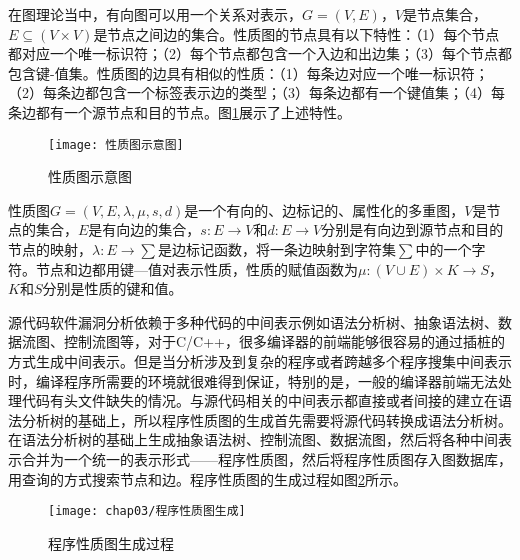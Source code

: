 在图理论当中，有向图可以用一个关系对表示，$G=(V,E)$，$V$是节点集合，$E\subseteq(V \times V)$是节点之间边的集合。性质图的节点具有以下特性：{（1）}每个节点都对应一个唯一标识符；{（2）}每个节点都包含一个入边和出边集；{（3）}每个节点都包含键-值集。性质图的边具有相似的性质：{（1）}每条边对应一个唯一标识符；{（2）}每条边都包含一个标签表示边的类型；{（3）}每条边都有一个键值集；{（4）}每条边都有一个源节点和目的节点。图\ref{性质图示意图}展示了上述特性。


\begin{figure}[htp]
\centering
\texttt{[image: 性质图示意图]}
\caption{性质图示意图}
\label{性质图示意图}
\end{figure}


\begin{definition}
 \label{性质图定义}
 性质图$G=(V,E,\lambda ,\mu, s,d)$是一个有向的、边标记的、属性化的多重图，$V$是节点的集合，$E$是有向边的集合，$s: E \rightarrow V$和$d:E \rightarrow V$分别是有向边到源节点和目的节点的映射，$\lambda : E \rightarrow \sum $是边标记函数，将一条边映射到字符集$\sum$中的一个字符。节点和边都用键—值对表示性质，性质的赋值函数为$\mu:(V \cup E) \times K \rightarrow S$，$K$和$S$分别是性质的键和值。
\end{definition}

源代码软件漏洞分析依赖于多种代码的中间表示例如语法分析树、抽象语法树、数据流图、控制流图等，对于C/C++，很多编译器的前端能够很容易的通过插桩的方式生成中间表示。但是当分析涉及到复杂的程序或者跨越多个程序搜集中间表示时，编译程序所需要的环境就很难得到保证，特别的是，一般的编译器前端无法处理代码有头文件缺失的情况。与源代码相关的中间表示都直接或者间接的建立在语法分析树的基础上，所以程序性质图的生成首先需要将源代码转换成语法分析树。在语法分析树的基础上生成抽象语法树、控制流图、数据流图，然后将各种中间表示合并为一个统一的表示形式——程序性质图，然后将程序性质图存入图数据库，用查询的方式搜索节点和边。程序性质图的生成过程如图\ref{程序性质图生成过程}所示。

\begin{figure}[htp]
\centering
\texttt{[image: chap03/程序性质图生成]}
\caption{程序性质图生成过程}
\label{程序性质图生成过程}
\end{figure}

